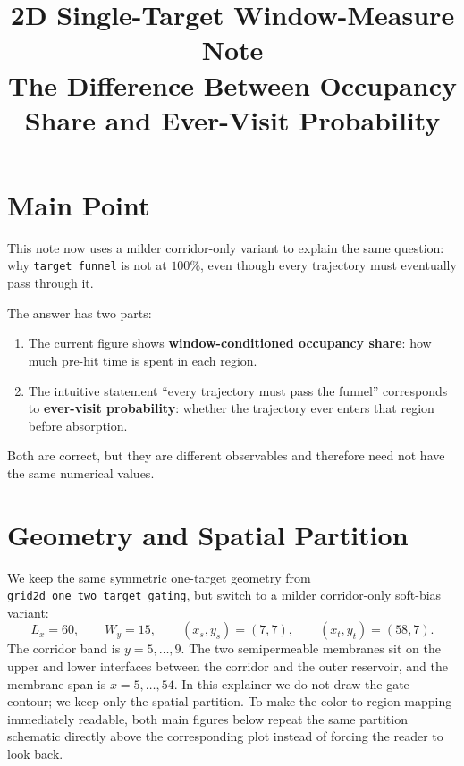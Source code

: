 \documentclass[11pt]{article}
\title{2D Single-Target Window-Measure Note\\\large The Difference Between Occupancy Share and Ever-Visit Probability}
\author{}
\date{}
\begin{document}
\maketitle

\section*{Main Point}
This note now uses a milder corridor-only variant to explain the same question: why \texttt{target funnel} is not at $100\%$, even though every trajectory must eventually pass through it.

The answer has two parts:
\begin{enumerate}
  \item The current figure shows \textbf{window-conditioned occupancy share}: how much pre-hit time is spent in each region.
  \item The intuitive statement ``every trajectory must pass the funnel'' corresponds to \textbf{ever-visit probability}: whether the trajectory ever enters that region before absorption.
\end{enumerate}
Both are correct, but they are different observables and therefore need not have the same numerical values.

\section{Geometry and Spatial Partition}
We keep the same symmetric one-target geometry from \texttt{grid2d\_one\_two\_target\_gating}, but switch to a milder corridor-only soft-bias variant:
\[
L_x=60,\qquad W_y=15,\qquad (x_s,y_s)=(7,7),\qquad (x_t,y_t)=(58,7).
\]
The corridor band is $y=5,\dots,9$. The two semipermeable membranes sit on the upper and lower interfaces between the corridor and the outer reservoir, and the membrane span is $x=5,\dots,54$. In this explainer we do not draw the gate contour; we keep only the spatial partition. To make the color-to-region mapping immediately readable, both main figures below repeat the same partition schematic directly above the corresponding plot instead of forcing the reader to look back.
\end{document}
